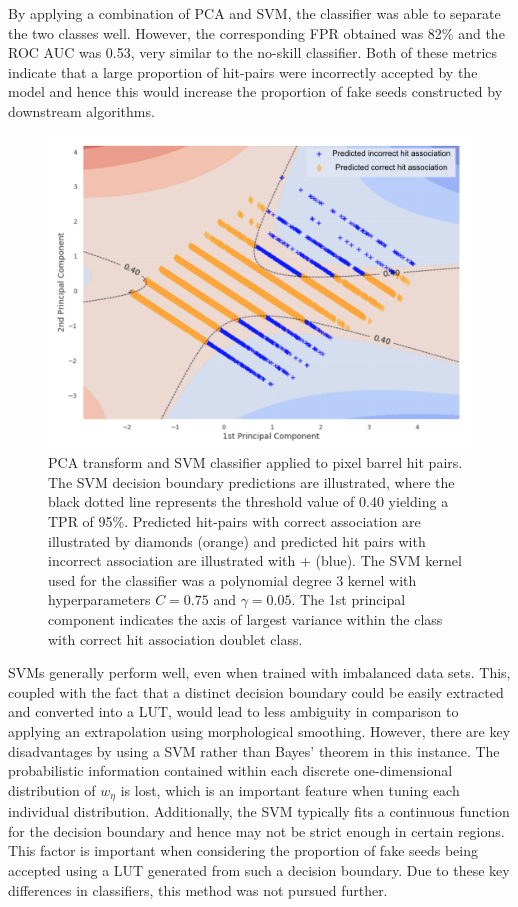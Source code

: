 By applying a combination of PCA and SVM, the classifier was able to separate the two classes well. However, the corresponding FPR obtained was 82\% and the ROC AUC was 0.53, very similar to the no-skill classifier. Both of these metrics indicate that a large proportion of hit-pairs were incorrectly accepted by the model and hence this would increase the proportion of fake seeds constructed by downstream algorithms.

\begin{figure}[htbp]
\centering
\includegraphics[width=1.0\linewidth]{images/4-ml-based-predictor/barrel-svm-pca.png}
\caption{PCA transform and SVM classifier applied to pixel barrel hit pairs. The SVM decision boundary predictions are illustrated, where the black dotted line represents the threshold value of 0.40 yielding a TPR of 95\%. Predicted hit-pairs with correct association are illustrated by diamonds (orange) and predicted hit pairs with incorrect association are illustrated with + (blue). The SVM kernel used for the classifier was a polynomial degree 3 kernel with hyperparameters $C=0.75$ and $\gamma=0.05$. The 1st principal component indicates the axis of largest variance within the class with correct hit association doublet class.}
\label{fig:barrel-svm-pca}
\end{figure}

SVMs generally perform well, even when trained with imbalanced data sets. This, coupled with the fact that a distinct decision boundary could be easily extracted and converted into a LUT, would lead to less ambiguity in comparison to applying an extrapolation using morphological smoothing. However, there are key disadvantages by using a SVM rather than Bayes' theorem in this instance. The probabilistic information contained within each discrete one-dimensional distribution of $w_{\eta}$ is lost, which is an important feature when tuning each individual distribution. Additionally, the SVM typically fits a continuous function for the decision boundary and hence may not be strict enough in certain regions. This factor is important when considering the proportion of fake seeds being accepted using a LUT generated from such a decision boundary. Due to these key differences in classifiers, this method was not pursued further.


